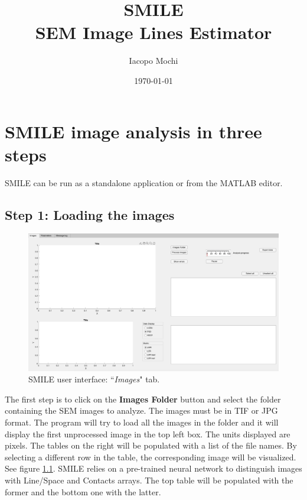 \documentclass[12pt, a4paper, openany]{report}
\begin{document}
\title{SMILE\\
SEM Image Lines Estimator}
\author{Iacopo Mochi}
\date{\today}

\maketitle


\chapter{SMILE image analysis in three steps}
SMILE can  be run as a standalone application or from the MATLAB editor.
\section{Step 1: Loading the images}
\begin{figure}[hbtp]
	\includegraphics[width=\textwidth]{figures/GUI_01.png}
	\caption{SMILE user interface: ``\emph{Images}" tab.}
	\label{fig:GUI_01}
\end{figure}
The first step is to click on the \textbf{Images Folder} button and select the folder containing the SEM images to analyze. The images must be in TIF or JPG format. The program will try to load all the images in the folder and it will display the first unprocessed image in the top left box. The units displayed are pixels. The tables on the right will be populated with a list of the file names. By selecting a different row in the table, the corresponding image will be visualized. See figure \ref{fig:GUI_01}. SMILE relies on a pre-trained neural network to distinguish images with Line/Space and Contacts arrays. The top table will be populated with the former and the bottom one with the latter.
\end{document}
